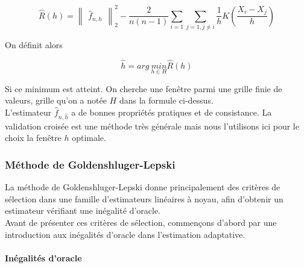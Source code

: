 \documentclass[
]{book}
\begin{document}
\[
\hat{R}(h)=\begin{Vmatrix}\hat{f}_{n,h}\end{Vmatrix}_2^2-\frac{2}{n(n-1)}\sum_{i=1}\sum_{j=1,j\ne i}\frac{1}{h}K(\frac{X_i-X_j}{h})
\]

On définit alors

\[
\hat{h} = arg\ \underset{h\in H}{min}\hat{R}(h)
\]

Si ce minimum est atteint. On cherche une fenêtre parmi une grille finie de valeurs, grille qu'on a notée \(H\) dans la formule ci-dessus.\\
L'estimateur \(\hat{f}_{n,\hat{h}}\) a de bonnes propriétés pratiques et de consistance.
La validation croisée est une méthode très générale mais nous l'utilisons ici pour le choix la fenêtre \(h\) optimale.

\hypertarget{muxe9thode-de-goldenshluger-lepski}{%
\subsubsection{Méthode de Goldenshluger-Lepski}\label{muxe9thode-de-goldenshluger-lepski}}

La méthode de Goldenshluger-Lepski donne principalement des critères de sélection dans une famille d'estimateurs linéaires à noyau, afin d'obtenir un estimateur vérifiant une inégalité d'oracle.\\
Avant de présenter ces critères de sélection, commençons d'abord par une introduction aux inégalités d'oracle dans l'estimation adaptative.

\hypertarget{inuxe9galituxe9s-doracle}{%
\paragraph{Inégalités d'oracle}\label{inuxe9galituxe9s-doracle}}
\end{document}

